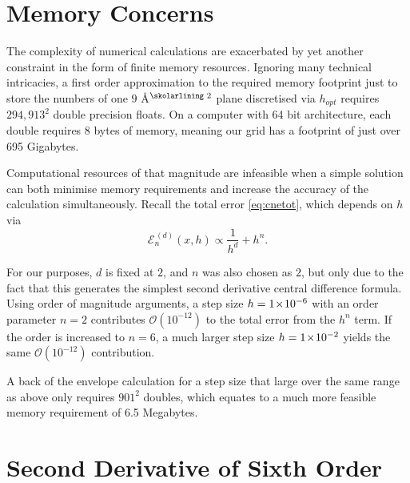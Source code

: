 \section{Memory Concerns}\label{sec:memcons}

The complexity of numerical calculations are exacerbated by yet another constraint in the form of finite memory resources.
Ignoring many technical intricacies, a first order approximation to the required memory footprint just to store the numbers of one $9$ Å$^\text{\skolarlining 2}$ plane discretised via $h_{opt}$ requires $294,913^2$ double precision floats.
On a computer with 64 bit architecture, each double requires 8 bytes of memory, meaning our grid has a footprint of just over 695 Gigabytes.

Computational resources of that magnitude are infeasible when a simple solution can both minimise memory requirements and increase the accuracy of the calculation simultaneously.
Recall the total error \cref{eq:cnetot}, which depends on $h$ via
\begin{equation}
\mathcal{E}_n^{\,(d)}(x,h) \propto \frac{1}{h^d} + h^n.
\end{equation}

For our purposes, $d$ is fixed at $2$, and $n$ was also chosen as $2$, but only due to the fact that this generates the simplest second derivative central difference formula.
Using order of magnitude arguments, a step size $h = 1\!\times\!10^{-6}$ with an order parameter $n = 2$ contributes $\mathcal{O}(10^{-12})$ to the total error from the $h^n$ term.
If the order is increased to $n = 6$, a much larger step size $h = 1\!\times\!10^{-2}$ yields the same $\mathcal{O}(10^{-12})$ contribution.

A back of the envelope calculation for a step size that large over the same range as above only requires $901^2$ doubles, which equates to a much more feasible memory requirement of 6.5 Megabytes.

\section{Second Derivative of Sixth Order}\label{sec:cd6o}


